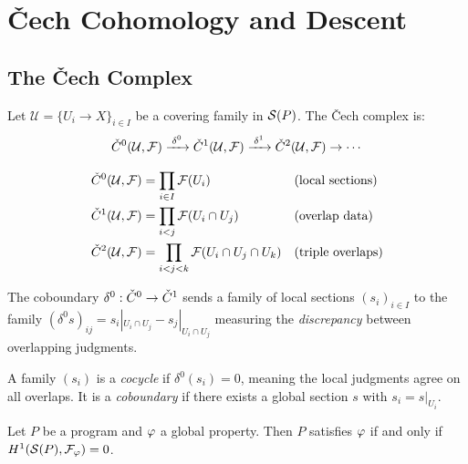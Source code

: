 \section{\v{C}ech Cohomology and Descent}\label{sec:descent}

\subsection{The \v{C}ech Complex}\label{subsec:cech}

Let $\mathcal{U} = \{U_i \to X\}_{i \in I}$ be a covering family in $\mathcal{S}(P)$.
The \v{C}ech complex is:
\[
  \check{C}^0(\mathcal{U}, \mathcal{F}) \xrightarrow{\;\delta^0\;}
  \check{C}^1(\mathcal{U}, \mathcal{F}) \xrightarrow{\;\delta^1\;}
  \check{C}^2(\mathcal{U}, \mathcal{F}) \to \cdots
\]

\begin{definition}
\begin{align}
  \check{C}^0(\mathcal{U}, \mathcal{F}) &= \prod_{i \in I} \mathcal{F}(U_i)
    && \text{(local sections)} \\
  \check{C}^1(\mathcal{U}, \mathcal{F}) &= \prod_{i < j} \mathcal{F}(U_i \cap U_j)
    && \text{(overlap data)} \\
  \check{C}^2(\mathcal{U}, \mathcal{F}) &= \prod_{i < j < k}
    \mathcal{F}(U_i \cap U_j \cap U_k)
    && \text{(triple overlaps)}
\end{align}
\end{definition}

\begin{definition}
The coboundary $\delta^0: \check{C}^0 \to \check{C}^1$ sends a family of local
sections $(s_i)_{i \in I}$ to the family
$(\delta^0 s)_{ij} = s_i|_{U_i \cap U_j} - s_j|_{U_i \cap U_j}$
measuring the \emph{discrepancy} between overlapping judgments.
\end{definition}

A family $(s_i)$ is a \emph{cocycle} if $\delta^0(s_i) = 0$, meaning
the local judgments agree on all overlaps.  It is a \emph{coboundary}
if there exists a global section $s$ with $s_i = s|_{U_i}$.

\begin{theorem}\label{thm:fundamental}
Let $P$ be a program and $\varphi$ a global property.  Then $P$ satisfies
$\varphi$ if and only if $H^{1}(\mathcal{S}(P), \mathcal{F}_\varphi) = 0$.
\end{theorem}

